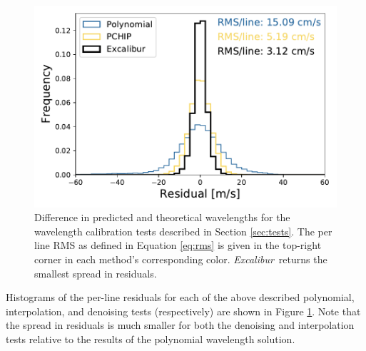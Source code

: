 \documentclass[modern]{aastex63}
\newcommand{\project}[1]{\textsl{#1}}
\newcommand{\name}{\project{Excalibur}}
\begin{document}
\begin{figure}[t]
\centering
\includegraphics[width=.6\textwidth]{Figures/all_results.pdf}
\caption{Difference in predicted and theoretical wavelengths for the wavelength calibration tests described in Section \ref{sec:tests}.  The per line RMS as defined in Equation \ref{eq:rms} is given in the top-right corner in each method's corresponding color.  \name\ returns the smallest spread in residuals.}
\label{fig:testHists}
\end{figure} 

Histograms of the per-line residuals for each of the above described polynomial, interpolation, and denoising tests (respectively) are shown in Figure \ref{fig:testHists}.  Note that the spread in residuals is much smaller for both the denoising and interpolation tests relative to the results of the polynomial wavelength solution.
\end{document}
